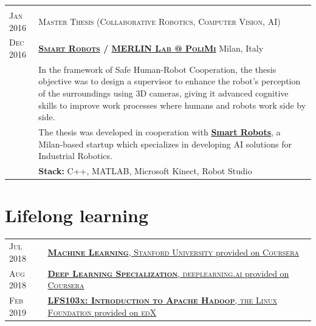 \documentclass[a4paper,10pt]{article}
\begin{document}
\begin{tabular}{p{1.7cm}|p{15.5cm}}
      \multicolumn{2}{c}{} \\
      \centering\textsc{Jan 2016 } & 
      \textsc{Master Thesis (Collaborative Robotics, Computer Vision, AI)} \\
      \centering\textsc{Dec 2016} &
      \textsc{\textbf{\href{http://smartrobots.it/en/}{Smart Robots} / \href{http://merlin.dei.polimi.it/}{MERLIN Lab @ PoliMi}}} \hfill Milan, Italy\\
      & In the framework of Safe Human-Robot Cooperation, the thesis objective was to design a supervisor to enhance the robot's perception of the surroundings using 3D cameras, giving it advanced cognitive skills to improve work processes where humans and robots work side by side.\\
      & The thesis was developed in cooperation with \textbf{\href{http://smartrobots.it/en/}{Smart Robots}}, a Milan-based startup which specializes in developing AI solutions for Industrial Robotics.\\
      & \textbf{Stack:} C++, MATLAB, Microsoft Kinect, Robot Studio\\
   \end{tabular}

   \section{Lifelong learning}
   \begin{tabular}{p{1.7cm}|p{15.5cm}}
      \centering\textsc{Jul 2018} &
      \href{https://www.coursera.org/account/accomplishments/certificate/PHU5XX9EQ5LP}{\textbf{\textsc{Machine Learning}}, \textsc{Stanford University} provided on \textsc{Coursera}} \\
      
      \centering\textsc{Aug 2018} &
      \href{https://www.coursera.org/account/accomplishments/specialization/certificate/MQRAWL6XD2QW}{\textbf{\textsc{Deep Learning Specialization}}, \textsc{deeplearning.ai} provided on \textsc{Coursera}} \\
      
      \centering\textsc{Feb 2019} &
      \href{https://courses.edx.org/certificates/62fb5163c20048faa605408b3f931718}{\textbf{\textsc{LFS103x: Introduction to Apache Hadoop}}, \textsc{the Linux Foundation} provided on \textsc{edX}} \\

   \end{tabular}
\end{document}
